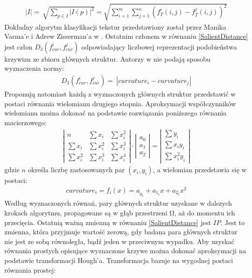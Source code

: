 \documentclass[12pt, twoside, openany]{report}
\theoremstyle{definition}
\begin{document}
\begin{align}
\left|I\right|=\ \sqrt{\sum_{p\in I}{{\left|I\left(p\right)\right|}^2}}=\sqrt{{\sum^m_{i=1}{\sum^n_{j=1}{\left(f^i_T(i,j)-f^j_T(i,j)\right)}}}^2}
\end{align}
Dokładny algorytm klasyfikacji tekstur przedstawiony został przez Manika Varma'e i Adrew Zisserman'a w \cite{varma2009statistical}. Ostatnim członem w równaniu \eqref{SalientDistance} jest człon $D_3\left(f^i_{cur},f^j_{cur}\right)$ odpowiadający liczbowej reprezentacji podobieństwa krzywizn ze zbioru głównych struktur. Autorzy w \cite{SalientStrucTexProp} nie podają sposobu wyznaczenia normy:
\begin{align}
D_3\left(f^i_{cur},f^j_{cur}\right)=\ \left|curvature_i-curvature_j\right|
\end{align}
Proponują natomiast każdą z wyznaczonych głównych struktur przedstawić w postaci równania wielomianu drugiego stopnia. Aproksymacji współczynników wielomianu można dokonać na podstawie rozwiązania poniższego równania macierzowego:
\begin{align}
\left| \begin{array}{ccc}
n & \sum{x_i} & \sum{x^2_i} \\ 
\sum{x_i} & \sum{x^2_i} & \sum{x^3_i} \\ 
\sum{x^2_i} & \sum{x^3_i} & \sum{x^4_i} \end{array}
\right|\cdot \left| \begin{array}{c}
a_0 \\ 
a_1 \\ 
a_2 \end{array}
\right|=\left| \begin{array}{c}
\sum{y_i} \\ 
\sum{x_iy_i} \\ 
\sum{{x^2_iy}_i} \end{array}
\right|
\end{align}
gdzie $n$ określa liczbę zastosowanych par $(x_i,y_i)$, a wielomian przedstawia się w postaci:
\begin{align}
curvature_i={f_i\left(x\right)=a}_{0_i}+a_{1_i}x+a_{2_i}x^2
\end{align}
Według wyznaczonych równań, pary głównych struktur uzyskane w dalszych krokach algorytmu, propagowane są w głąb przestrzeni $\mathrm{\Omega }$, aż do momentu ich przecięcia. Ostatnią ważną zmienną w równaniu \eqref{SalientDistance} jest $IP$. Jest to zmienna, która przyjmuje wartość zerową, gdy badana para głównych struktur nie jest ze sobą równoległa, bądź jeden w przeciwnym wypadku. Aby uzyskać równania prostych opisujące wyznaczone krzywe można dokonać aproksymacji na podstawie transformacji Hough'a. Transformacja bazuje na wygodnej postaci równania prostej:
\end{document}
